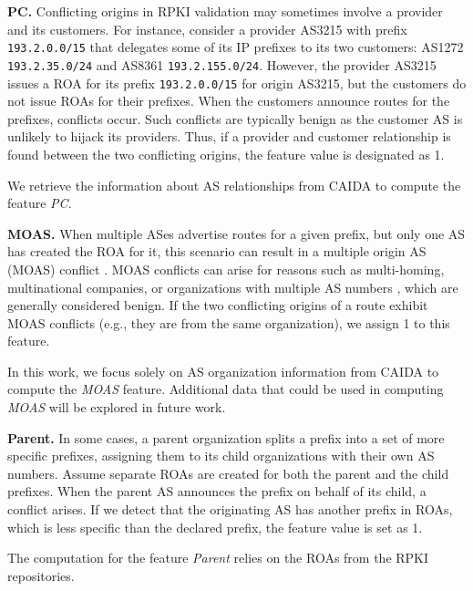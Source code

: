 \noindent\textbf{PC.} Conflicting origins in RPKI validation may sometimes involve a provider and its customers.
For instance, consider a provider AS3215 with prefix \texttt{193.2.0.0/15} that delegates some of its IP prefixes to its two customers: AS1272 \texttt{193.2.35.0/24} and AS8361 \texttt{193.2.155.0/24}. However, the provider AS3215 issues a ROA for its prefix \texttt{193.2.0.0/15} for origin AS3215, but the customers do not issue ROAs for their prefixes. When the customers announce routes for the prefixes, conflicts occur. 
Such conflicts are typically benign as the customer AS is unlikely to hijack its providers.
Thus, if a provider and customer relationship is found between the two conflicting origins, the feature value is designated as 1.

We retrieve the information about AS relationships from CAIDA \cite{CAIDA} to compute the feature \textit{PC}.

\noindent\textbf{MOAS.} When multiple ASes advertise routes for a given prefix, but only one AS has created the ROA for it, this scenario can result in a multiple origin AS (MOAS)
conflict \cite{chin2007characteristics,zhao2001analysis}. MOAS conflicts can arise for reasons such as multi-homing, multinational companies, or organizations with multiple AS numbers \cite{chin2007characteristics}, which are generally considered benign.
If the two conflicting origins of a route exhibit MOAS conflicts (e.g., they are from the same organization), we assign 1 to this feature.

In this work, we focus solely on AS organization information from CAIDA to compute the \textit{MOAS} feature. Additional data that could be used in computing \textit{MOAS} will be explored in future work.

\noindent\textbf{Parent.} In some cases, a parent organization splits a prefix into a set of more specific prefixes, assigning them to its child organizations with their own AS numbers. Assume separate ROAs are created for both the parent and the child prefixes. When the parent AS announces the prefix on behalf of its child, a conflict arises. If we detect that the originating AS has another prefix in ROAs, which is less specific than the declared prefix, the feature value is set as 1.

The computation for the feature \textit{Parent} relies on the ROAs from the RPKI repositories.

